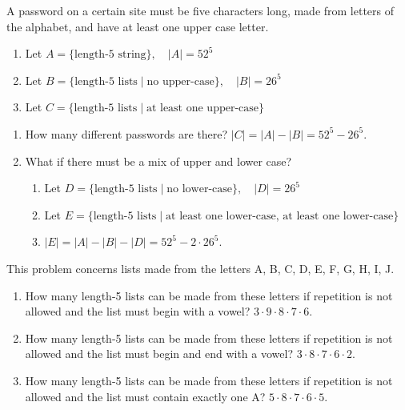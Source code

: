 \documentclass[openany, 11pt]{book}
\begin{document}
\begin{exercise}{}{}
	A password on a certain site must be five characters long,
	made from letters of the alphabet, and have at least one upper case letter.
	\begin{enumerate}[label={}, leftmargin=*, itemsep=0pt, parsep=0pt]
		\item Let $A=\{\text{length-5 string}\},\quad |A| = 52^5$
		\item Let $B=\{\text{length-5 lists}\mid\text{no upper-case}\}, \quad |B| = 26^5$
		\item Let $C=\{\text{length-5 lists}\mid\text{at least one upper-case}\}$
	\end{enumerate}
	\begin{enumerate}[label = {(\arabic*)}]
		\item How many different passwords are there?
		      $|C| = |A| - |B| = 52^5 - 26^5.$
		\item What if there must be a mix of upper and lower case?
		      \begin{enumerate}[label={}, leftmargin=*, itemsep=0pt, parsep=0pt]
			      \item Let $D=\{\text{length-5 lists}\mid\text{no lower-case}\}, \quad |D| = 26^5$
			      \item Let $E=\{\text{length-5 lists}\mid\text{at least one lower-case, at least one lower-case}\}$
			      \item $|E| = |A| - |B| - |D| = 52^5 - 2\cdot26^5.$
		      \end{enumerate}
	\end{enumerate}
\end{exercise}

\begin{exercise}{}{}
	This problem concerns lists made from the letters A, B, C, D, E, F, G, H, I, J.
	\begin{enumerate}[label = {(\arabic*)}]
		\item How many length-5 lists can be made from these letters if
		      repetition is not allowed and the list must begin with a vowel? $3
			      \cdot 9 \cdot 8 \cdot 7 \cdot 6$.
		\item How many length-5 lists can be made from these letters if
		      repetition is not allowed and the list must begin and end with a
		      vowel? $3 \cdot 8 \cdot 7 \cdot 6 \cdot 2$.
		\item How many length-5 lists can be made from these letters if
		      repetition is not allowed and the list must contain exactly one A?
		      $5 \cdot 8 \cdot 7 \cdot 6 \cdot 5$.
	\end{enumerate}
\end{exercise}
\end{document}
